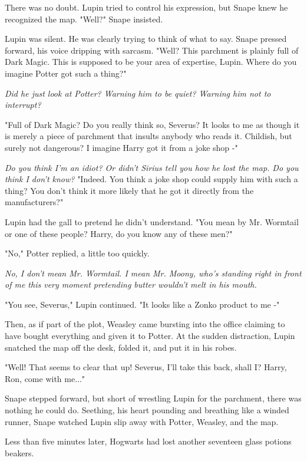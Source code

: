 There was no doubt. Lupin tried to control his expression, but Snape knew he recognized the map. "Well?" Snape insisted.

Lupin was silent. He was clearly trying to think of what to say. Snape pressed forward, his voice dripping with sarcasm. "Well? This parchment is plainly full of Dark Magic. This is supposed to be your area of expertise, Lupin. Where do you imagine Potter got such a thing?"

\emph{Did he just look at Potter? Warning him to be quiet? Warning him not to interrupt?}

"Full of Dark Magic? Do you really think so, Severus? It looks to me as though it is merely a piece of parchment that insults anybody who reads it. Childish, but surely not dangerous? I imagine Harry got it from a joke shop -"

\emph{Do you think I'm an idiot? Or didn't Sirius tell you how he lost the map. Do you think I don't know?} "Indeed. You think a joke shop could supply him with such a thing? You don't think it more likely that he got it directly from the manufacturers?"

Lupin had the gall to pretend he didn't understand. "You mean by Mr. Wormtail or one of these people? Harry, do you know any of these men?"

"No," Potter replied, a little too quickly.

\emph{No, I don't mean Mr. Wormtail. I mean Mr. Moony, who's standing right in front of me this very moment pretending butter wouldn't melt in his mouth.}

"You see, Severus," Lupin continued. "It looks like a Zonko product to me -"

Then, as if part of the plot, Weasley came bursting into the office claiming to have bought everything and given it to Potter. At the sudden distraction, Lupin snatched the map off the desk, folded it, and put it in his robes.

"Well! That seems to clear that up! Severus, I'll take this back, shall I? Harry, Ron, come with me..."

Snape stepped forward, but short of wrestling Lupin for the parchment, there was nothing he could do. Seething, his heart pounding and breathing like a winded runner, Snape watched Lupin slip away with Potter, Weasley, and the map.

Less than five minutes later, Hogwarts had lost another seventeen glass potions beakers.

\sbreak

